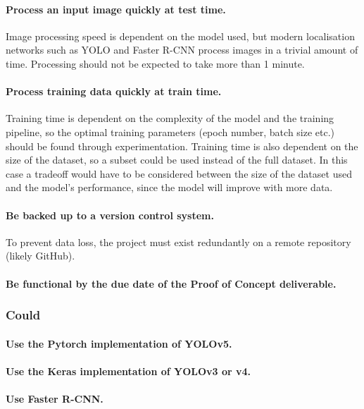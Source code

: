 \paragraph{Process an input image quickly at test time.}
Image processing speed is dependent on the model used, but modern localisation networks such as YOLO and Faster R-CNN process images in a trivial amount of time. Processing should not be expected to take more than 1 minute.

\paragraph{Process training data quickly at train time.}
Training time is dependent on the complexity of the model and the training pipeline, so the optimal training parameters (epoch number, batch size etc.) should be found through experimentation. Training time is also dependent on the size of the dataset, so a subset could be used instead of the full dataset. In this case a tradeoff would have to be considered between the size of the dataset used and the model’s performance, since the model will improve with more data.

\paragraph{Be backed up to a version control system.}
To prevent data loss, the project must exist redundantly on a remote repository (likely GitHub).

\paragraph{Be functional by the due date of the Proof of Concept deliverable.}

\subsubsection{Could} 
\paragraph{Use the Pytorch implementation of YOLOv5.}

\paragraph{Use the Keras implementation of YOLOv3 or v4.}

\paragraph{Use Faster R-CNN.}

